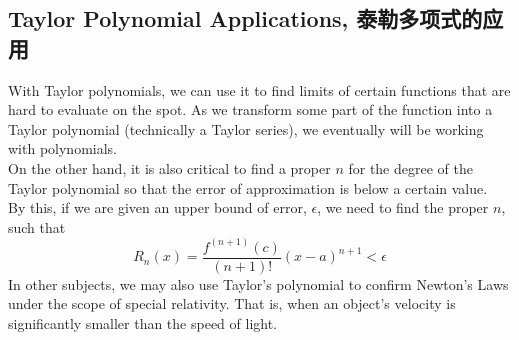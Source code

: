 \subsection{Taylor Polynomial Applications, 泰勒多项式的应用}
With Taylor polynomials, we can use it to find limits of certain functions that are hard to evaluate on the spot. As we transform some part of the function into a Taylor polynomial (technically a Taylor series), we eventually will be working with polynomials. \\
On the other hand, it is also critical to find a proper $n$ for the degree of the Taylor polynomial so that the error of approximation is below a certain value. \\
By this, if we are given an upper bound of error, $\epsilon$, we need to find the proper $n$, such that
$$R_n(x) = \frac{f^{(n+1)}(c)}{(n+1)!}(x-a)^{n+1} < \epsilon$$
In other subjects, we may also use Taylor's polynomial to confirm Newton's Laws under the scope of special relativity. That is, when an object's velocity is significantly smaller than the speed of light.